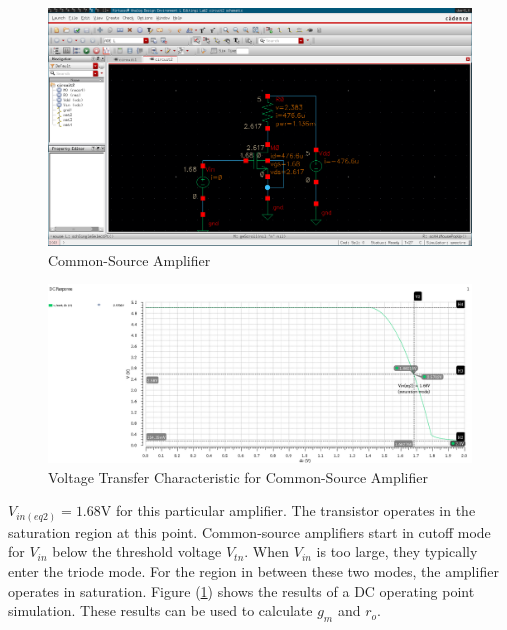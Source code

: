 
\FloatBarrier

\begin{figure}[h!]
	\centering
	\includegraphics[scale=0.30]{./images/circuit2.PNG}
	\caption{Common-Source Amplifier}
	\label{fig:circuit2}
\end{figure}

\FloatBarrier

\FloatBarrier

\begin{figure}[h!]
	\centering
	\includegraphics[scale=0.45]{./images/sim2_vtc.PNG}
	\caption{Voltage Transfer Characteristic for Common-Source Amplifier}
	\label{fig:sim2_vtc}
\end{figure}

\FloatBarrier
$V_{in(eq2)} = 1.68$\si{\volt} for this particular amplifier.
The transistor operates in the saturation region at this point.
Common-source amplifiers start in cutoff mode for $V_{in}$ below the threshold voltage $V_{tn}$.
When $V_{in}$ is too large, they typically enter the triode mode.
For the region in between these two modes, the amplifier operates in saturation.
Figure (\ref{fig:circuit2}) shows the results of a DC operating point simulation.
These results can be used to calculate $g_{m}$ and $r_{o}$.

